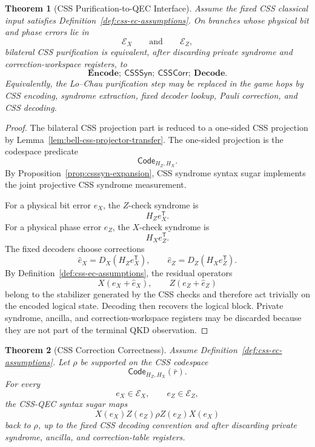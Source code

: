 \documentclass[acmsmall,screen,review,anonymous,nonacm]{acmart}
\theoremstyle{defn_style}
\newtheorem{thm}{Theorem}[section]
\begin{document}
\begin{thm}[CSS Purification-to-QEC Interface]
\label{thm:css-purification-qec-interface}
Assume the fixed CSS classical input satisfies
Definition~\ref{def:css-ec-assumptions}. On branches whose physical bit and
phase errors lie in
\[
\mathcal E_X
\qquad\text{and}\qquad
\mathcal E_Z,
\]
bilateral CSS purification is equivalent, after discarding private syndrome and
correction-workspace registers, to
\[
\mathbf{Encode};\ \mathsf{CSSSyn};\ \mathsf{CSSCorr};\ \mathbf{Decode}.
\]
Equivalently, the Lo--Chau purification step may be replaced in the game hops by
CSS encoding, syndrome extraction, fixed decoder lookup, Pauli correction, and
CSS decoding.
\end{thm}

\begin{proof}
The bilateral CSS projection part is reduced to a one-sided CSS projection by
Lemma~\ref{lem:bell-css-projector-transfer}. The one-sided projection is the
codespace predicate
\[
\mathsf{Code}_{H_Z,H_X}.
\]
By Proposition~\ref{prop:csssyn-expansion}, CSS syndrome syntax sugar
implements the joint projective CSS syndrome measurement.

For a physical bit error \(e_X\), the \(Z\)-check syndrome is
\[
H_Ze_X^{\mathsf T}.
\]
For a physical phase error \(e_Z\), the \(X\)-check syndrome is
\[
H_Xe_Z^{\mathsf T}.
\]
The fixed decoders choose corrections
\[
\hat e_X=D_X(H_Ze_X^{\mathsf T}),
\qquad
\hat e_Z=D_Z(H_Xe_Z^{\mathsf T}).
\]
By Definition~\ref{def:css-ec-assumptions}, the residual operators
\[
X(e_X+\hat e_X),
\qquad
Z(e_Z+\hat e_Z)
\]
belong to the stabilizer generated by the CSS checks and therefore act
trivially on the encoded logical state. Decoding then recovers the logical
block. Private syndrome, ancilla, and correction-workspace registers may be
discarded because they are not part of the terminal QKD observation.
\end{proof}

\begin{thm}[CSS Correction Correctness]
\label{thm:css-correction-correctness}
Assume Definition~\ref{def:css-ec-assumptions}. Let \(\rho\) be supported on
the CSS codespace
\[
\mathsf{Code}_{H_Z,H_X}(\bar r).
\]
For every
\[
e_X\in\mathcal E_X,
\qquad
e_Z\in\mathcal E_Z,
\]
the CSS-QEC syntax sugar maps
\[
X(e_X)Z(e_Z)\rho Z(e_Z)X(e_X)
\]
back to \(\rho\), up to the fixed CSS decoding convention and after discarding
private syndrome, ancilla, and correction-table registers.
\end{thm}
\end{document}
